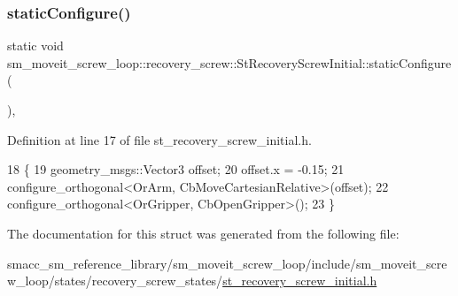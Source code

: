 \subsubsection{\texorpdfstring{static\+Configure()}{staticConfigure()}}
{\footnotesize\ttfamily static void sm\+\_\+moveit\+\_\+screw\+\_\+loop\+::recovery\+\_\+screw\+::\+St\+Recovery\+Screw\+Initial\+::static\+Configure (\begin{DoxyParamCaption}{ }\end{DoxyParamCaption})\hspace{0.3cm}{\ttfamily [inline]}, {\ttfamily [static]}}



Definition at line 17 of file st\+\_\+recovery\+\_\+screw\+\_\+initial.\+h.


\begin{DoxyCode}
18             \{
19                 geometry\_msgs::Vector3 offset;
20                 offset.x = -0.15;
21                 configure\_orthogonal<OrArm, CbMoveCartesianRelative>(offset);
22                 configure\_orthogonal<OrGripper, CbOpenGripper>();
23             \}
\end{DoxyCode}


The documentation for this struct was generated from the following file\+:\begin{DoxyCompactItemize}
\item 
smacc\+\_\+sm\+\_\+reference\+\_\+library/sm\+\_\+moveit\+\_\+screw\+\_\+loop/include/sm\+\_\+moveit\+\_\+screw\+\_\+loop/states/recovery\+\_\+screw\+\_\+states/\hyperlink{sm__moveit__screw__loop_2include_2sm__moveit__screw__loop_2states_2recovery__screw__states_2st__recovery__screw__initial_8h}{st\+\_\+recovery\+\_\+screw\+\_\+initial.\+h}\end{DoxyCompactItemize}
